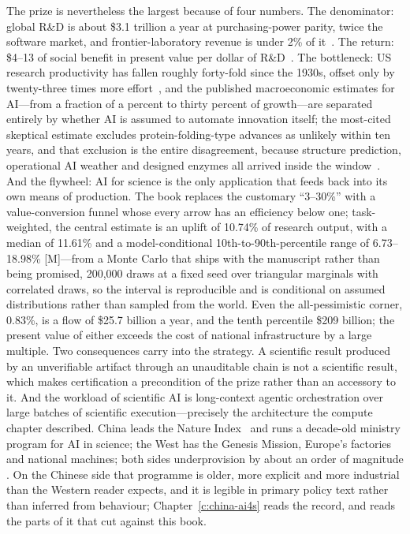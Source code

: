 The prize is nevertheless the largest because of four numbers. The denominator: global R\&D is about \$3.1 trillion a year at purchasing-power parity, twice the software market, and frontier-laboratory revenue is under 2\% of it~\cite{nsf-indicators}. The return: \$4--13 of social benefit in present value per dollar of R\&D~\cite{jones-summers}. The bottleneck: US research productivity has fallen roughly forty-fold since the 1930s, offset only by twenty-three times more effort~\cite{ideas-harder}, and the published macroeconomic estimates for AI---from a fraction of a percent to thirty percent of growth---are separated entirely by whether AI is assumed to automate innovation itself; the most-cited skeptical estimate excludes protein-folding-type advances as unlikely within ten years, and that exclusion is the entire disagreement, because structure prediction, operational AI weather and designed enzymes all arrived inside the window~\cite{acemoglu}. And the flywheel: AI for science is the only application that feeds back into its own means of production. The book replaces the customary ``3--30\%'' with a value-conversion funnel whose every arrow has an efficiency below one; task-weighted, the central estimate is an uplift of 10.74\% of research output, with a median of 11.61\% and a model-conditional 10th-to-90th-percentile range of 6.73--18.98\% [M]---from a Monte Carlo that ships with the manuscript rather than being promised, 200,000 draws at a fixed seed over triangular marginals with correlated draws, so the interval is reproducible and is conditional on assumed distributions rather than sampled from the world. Even the all-pessimistic corner, 0.83\%, is a flow of \$25.7 billion a year, and the tenth percentile \$209 billion; the present value of either exceeds the cost of national infrastructure by a large multiple. Two consequences carry into the strategy. A scientific result produced by an unverifiable artifact through an unauditable chain is not a scientific result, which makes certification a precondition of the prize rather than an accessory to it. And the workload of scientific AI is long-context agentic orchestration over large batches of scientific execution---precisely the architecture the compute chapter described. China leads the Nature Index~\cite{nature-index-2026} and runs a decade-old ministry program for AI in science; the West has the Genesis Mission, Europe's factories and national machines; both sides underprovision by about an order of magnitude . On the Chinese side that programme is older, more explicit and more industrial than the Western reader expects, and it is legible in primary policy text rather than inferred from behaviour; Chapter~\ref{c:china-ai4s} reads the record, and reads the parts of it that cut against this book.

